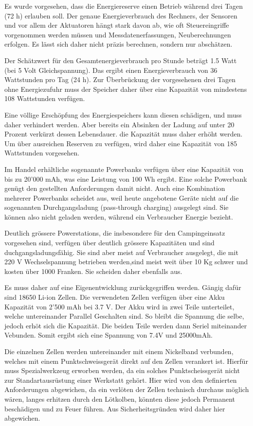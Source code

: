 Es wurde vorgesehen, dass die Energiereserve einen Betrieb während drei Tagen (72 h) erlauben soll. Der genaue Energieverbrauch des Rechners, der Sensoren und vor allem der Aktuatoren hängt stark davon ab, wie oft Steuereingriffe vorgenommen werden müssen und Messdatenerfassungen, Neuberechnungen erfolgen. Es lässt sich daher nicht präzis berechnen, sondern nur abschätzen. 

Der Schätzwert für den Gesamtenergieverbrauch pro Stunde beträgt 1.5 Watt (bei 5 Volt Gleichspannung). Das ergibt einen Energieverbrauch von 36 Wattstunden pro Tag (24 h). Zur Überbrückung der vorgesehenen drei Tagen ohne Energiezufuhr muss der Speicher daher über eine Kapazität von mindestens 108 Wattstunden verfügen. 

Eine völlige Erschöpfung des Energiespeichers kann diesen schädigen, und muss daher verhindert werden. Aber bereits ein Absinken der Ladung auf unter 20 Prozent verkürzt dessen Lebensdauer. die Kapazität muss daher erhöht werden. Um über ausreichen Reserven zu verfügen, wird daher eine Kapazität von 185 Wattstunden vorgesehen.

Im Handel erhältliche sogenannte Powerbanks verfügen über eine Kapazität von bis zu 20'000 mAh, was eine Leistung von 100 Wh ergibt. Eine solche Powerbank genügt den gestellten Anforderungen damit nicht. Auch eine Kombination mehrerer Powerbanks scheidet aus, weil heute angebotene Geräte nicht auf die sogenannten Durchgangsladung (pass‐through charging) ausgelegt sind. Sie können also nicht geladen werden, während ein Verbraucher Energie bezieht.  

Deutlich grössere Powerstations, die insbesondere für den Campingeinsatz vorgesehen sind, verfügen über deutlich grössere Kapazitäten und sind duchgangsladungsfähig. Sie sind aber meist auf Verbraucher ausgelegt, die mit 220 V Wechselspannung betrieben werden,sind meist weit über 10 Kg schwer und kosten über 1000 Franken. Sie scheiden daher ebenfalls aus.   

Es muss daher auf eine Eigenentwicklung zurückgegriffen werden. Gängig dafür sind 18650 Li-ion Zellen. Die verwendeten Zellen verfügen über eine Akku Kapazität von 2'500 mAh bei 3.7 V. 
Der Akku wird in zwei Teile unterteilet, welche untereinander Parallel Geschalten sind. So bleibt die Spannung die selbe, jedoch erhöt sich die Kapazität. Die beiden Teile werden dann Seriel miteinander Vebunden. Somit ergibt sich eine Spannung von 7.4V und 25000mAh. 

Die einzelnen Zellen werden untereinander mit einem Nickelband verbunden, welches mit einem Punktschweissgerät direkt auf den Zellen verankert ist. Hierfür muss Spezialwerkzeug erworben werden, da ein solches Punktscheissgerät nicht zur Standartausrüstung einer Werkstatt gehört. Hier wird von den definierten Anforderungen abgewichen, da ein verlöten der Zellen technisch durchaus möglich wären, langes erhitzen durch den Lötkolben, könnten diese jedoch Permanent beschädigen und zu Feuer führen. Aus Sicherheitsgründen wird daher hier abgewichen. 




